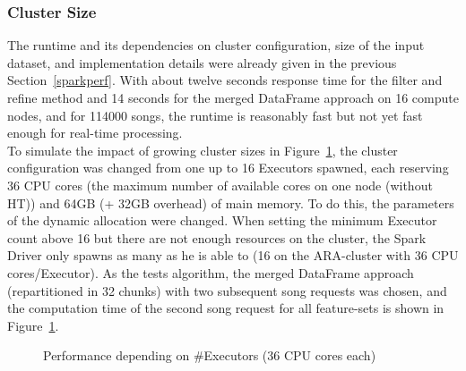 \subsubsection{Cluster Size}

\noindent The runtime and its dependencies on cluster configuration, size of the input dataset, and implementation details were already given in the previous Section~\ref{sparkperf}. With about twelve seconds response time for the filter and refine method and 14 seconds for the merged DataFrame approach on 16 compute nodes, and for 114000 songs, the runtime is reasonably fast but not yet fast enough for real-time processing.\\ 
\noindent To simulate the impact of growing cluster sizes in Figure~\ref{perfspark6}, the cluster configuration was changed from one up to 16 Executors spawned, each reserving 36 CPU cores (the maximum number of available cores on one node (without HT)) and 64GB (+ 32GB overhead) of main memory. To do this, the parameters of the dynamic allocation were changed. When setting the minimum Executor count above 16 but there are not enough resources on the cluster, the Spark Driver only spawns as many as he is able to (16 on the ARA-cluster with 36 CPU cores/Executor). As the tests algorithm, the merged DataFrame approach (repartitioned in 32 chunks) with two subsequent song requests was chosen, and the computation time of the second song request for all feature-sets is shown in Figure~\ref{perfspark6}.\\

\FloatBarrier
\begin{figure}[htbp]
   	\centering
   	\caption{Performance depending on \#Executors (36 CPU cores each)}
   	\label{perfspark6}
\end{figure}
\FloatBarrier

